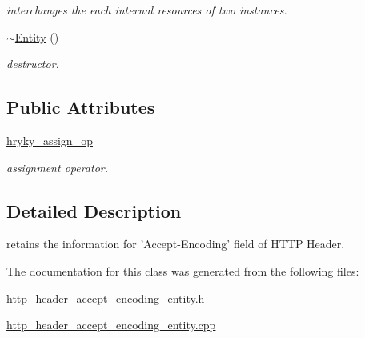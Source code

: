 \begin{DoxyCompactItemize}
\begin{DoxyCompactList}\small\item\em interchanges the each internal resources of two instances. \end{DoxyCompactList}\item 
\hypertarget{classhryky_1_1http_1_1header_1_1accept_1_1encoding_1_1_entity_a1854340f6d1a5e52a7ff4686b8b84a7e}{\hyperlink{classhryky_1_1http_1_1header_1_1accept_1_1encoding_1_1_entity_a1854340f6d1a5e52a7ff4686b8b84a7e}{$\sim$\-Entity} ()}\label{classhryky_1_1http_1_1header_1_1accept_1_1encoding_1_1_entity_a1854340f6d1a5e52a7ff4686b8b84a7e}

\begin{DoxyCompactList}\small\item\em destructor. \end{DoxyCompactList}\end{DoxyCompactItemize}
\subsection*{Public Attributes}
\begin{DoxyCompactItemize}
\item 
\hypertarget{classhryky_1_1http_1_1header_1_1accept_1_1encoding_1_1_entity_acdc308e9b12e8b77e0bbf828ec781b80}{\hyperlink{classhryky_1_1http_1_1header_1_1accept_1_1encoding_1_1_entity_acdc308e9b12e8b77e0bbf828ec781b80}{hryky\-\_\-assign\-\_\-op}}\label{classhryky_1_1http_1_1header_1_1accept_1_1encoding_1_1_entity_acdc308e9b12e8b77e0bbf828ec781b80}

\begin{DoxyCompactList}\small\item\em assignment operator. \end{DoxyCompactList}\end{DoxyCompactItemize}


\subsection{Detailed Description}
retains the information for 'Accept-\/\-Encoding' field of H\-T\-T\-P Header. 

The documentation for this class was generated from the following files\-:\begin{DoxyCompactItemize}
\item 
\hyperlink{http__header__accept__encoding__entity_8h}{http\-\_\-header\-\_\-accept\-\_\-encoding\-\_\-entity.\-h}\item 
\hyperlink{http__header__accept__encoding__entity_8cpp}{http\-\_\-header\-\_\-accept\-\_\-encoding\-\_\-entity.\-cpp}\end{DoxyCompactItemize}
